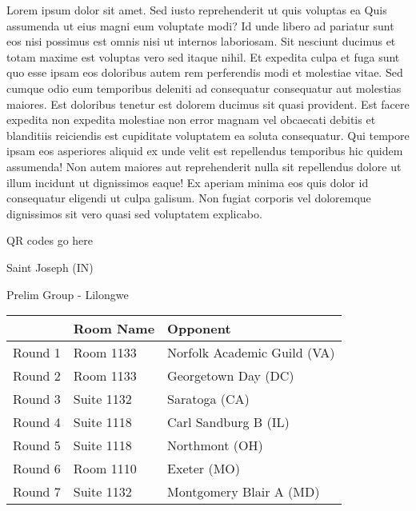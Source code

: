 \documentclass{article}%
\begin{document}
\vspace*{8pt}%
\linebreak%
\newline%
\newline%
Lorem ipsum dolor sit amet. Sed iusto reprehenderit ut quis voluptas ea Quis assumenda ut eius magni eum voluptate modi? Id unde libero ad pariatur sunt eos nisi possimus est omnis nisi ut internos laboriosam. Sit nesciunt ducimus et totam maxime est voluptas vero sed itaque nihil. Et expedita culpa et fuga sunt quo esse ipsam eos doloribus autem rem perferendis modi et molestiae vitae.\newline%
\newline%
Sed cumque odio eum temporibus deleniti ad consequatur consequatur aut molestias maiores. Est doloribus tenetur est dolorem ducimus sit quasi provident. Est facere expedita non expedita molestiae non error magnam vel obcaecati debitis et blanditiis reiciendis est cupiditate voluptatem ea soluta consequatur. Qui tempore ipsam eos asperiores aliquid ex unde velit est repellendus temporibus hic quidem assumenda!\newline%
\newline%
Non autem maiores aut reprehenderit nulla sit repellendus dolore ut illum incidunt ut dignissimos eaque! Ex aperiam minima eos quis dolor id consequatur eligendi ut culpa galisum. Non fugiat corporis vel doloremque dignissimos sit vero quasi sed voluptatem explicabo.\newline%
\newline%
%
\vspace*{30pt}%
\begin{center}%
\begin{Huge}%
QR codes go here%
\end{Huge}%
\end{center}%
\newpage%
%
\begin{center}%
\begin{Huge}%
Saint Joseph (IN)%
\end{Huge}%
\vspace*{8pt}%
\linebreak%
\begin{Large}%
Prelim Group {-} Lilongwe%
\end{Large}%
\end{center}%
\begin{tabularx}{\textwidth}{|c|Y|Y|}%
\hline%
&Room Name&Opponent\\%
\hline%
Round 1&Room 1133&Norfolk Academic Guild (VA)\\%
Round 2&Room 1133&Georgetown Day (DC)\\%
Round 3&Suite 1132&Saratoga (CA)\\%
Round 4&Suite 1118&Carl Sandburg B (IL)\\%
Round 5&Suite 1118&Northmont (OH)\\%
Round 6&Room 1110&Exeter (MO)\\%
Round 7&Suite 1132&Montgomery Blair A (MD)\\%
\hline%
\end{tabularx}%
\end{document}
